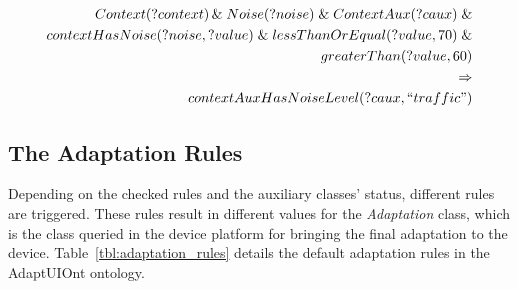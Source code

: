 \footnotesize
\begin{equation} \label{ec:pre_adaptation_rule}
  \begin{align*} 
  Context(?context)\,\&\; Noise(?noise)\; \&\; ContextAux(?caux)\; \& \\
  contextHasNoise(?noise, ?value)\; \&\; lessThanOrEqual(?value, 70)\; \& \\
  greaterThan(?value, 60) \\
  \Rightarrow \\
  contextAuxHasNoiseLevel(?caux, ``traffic")
  \end{align*}
\end{equation}
\normalsize


\subsection{The Adaptation Rules}
Depending on the checked rules and the auxiliary classes’ status, different 
rules are triggered. These rules result in different values for the \textit{Adaptation} 
class, which is the class queried in the device platform for bringing the final 
adaptation to the device. Table~\ref{tbl:adaptation_rules} details the default
adaptation rules in the AdaptUIOnt ontology.

